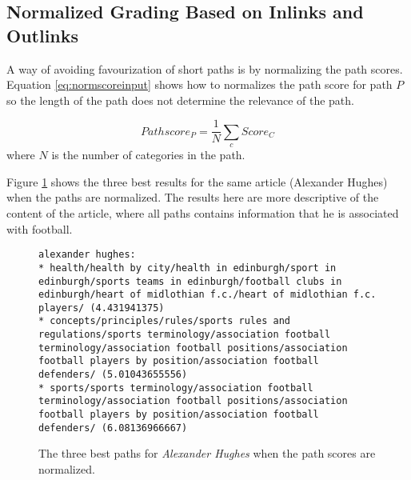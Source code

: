 \subsection{Normalized Grading Based on Inlinks and Outlinks}
A way of avoiding favourization of short paths is by normalizing the path scores. 
Equation \ref{eq:normscoreinput} shows how to normalizes the path score for path $P$ so the length of the path does not determine the relevance of the path. 


\begin{equation} \label{eq:normscoreinput}
Pathscore_{P} = \frac{1}{N} \sum_{c} Score_{C}
\end{equation}
where $N$ is the number of categories in the path.

Figure \ref{fig:norm_alexander_hughes} shows the three best results for the same article (Alexander Hughes) when the paths are normalized. The results here are more descriptive of the content of the article, where all paths contains information that he is associated with football. 

\begin{figure}
\centering
\begin{lstlisting}
alexander hughes:
* health/health by city/health in edinburgh/sport in edinburgh/sports teams in edinburgh/football clubs in edinburgh/heart of midlothian f.c./heart of midlothian f.c. players/ (4.431941375)
* concepts/principles/rules/sports rules and regulations/sports terminology/association football terminology/association football positions/association football players by position/association football defenders/ (5.01043655556)
* sports/sports terminology/association football terminology/association football positions/association football players by position/association football defenders/ (6.08136966667)

\end{lstlisting}
\caption[Example of normalized scores on paths]{The three best paths for \emph{Alexander Hughes} when the path scores are normalized. }
\label{fig:norm_alexander_hughes}
\end{figure}


